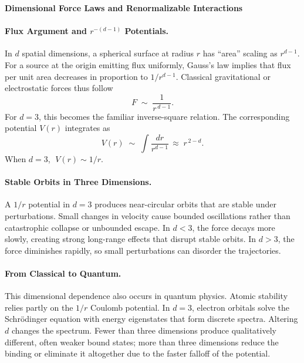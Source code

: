 \begin{technical}
    {\Large \textbf{Dimensional Force Laws and Renormalizable Interactions}}
    
    \paragraph{Flux Argument and $r^{-(d-1)}$ Potentials.}
    In $d$ spatial dimensions, a spherical surface at radius $r$ has ``area'' scaling as $r^{d-1}$. For a source at the origin emitting flux uniformly, Gauss's law implies that flux per unit area decreases in proportion to $1/r^{d-1}$. Classical gravitational or electrostatic forces thus follow 
    $$
    F \;\sim\; \frac{1}{r^{\,d-1}}.
    $$
    For $d=3$, this becomes the familiar inverse-square relation. The corresponding potential $V(r)$ integrates as
    $$
    V(r) \;\sim\; \int \frac{dr}{r^{d-1}} \,\approx\; r^{\,2-d}.
    $$
    When $d=3$, $\;V(r)\sim 1/r$.
    
    \paragraph{Stable Orbits in Three Dimensions.}
    A $1/r$ potential in $d=3$ produces near-circular orbits that are stable under perturbations. Small changes in velocity cause bounded oscillations rather than catastrophic collapse or unbounded escape. In $d<3$, the force decays more slowly, creating strong long-range effects that disrupt stable orbits. In $d>3$, the force diminishes rapidly, so small perturbations can disorder the trajectories.
    
    \paragraph{From Classical to Quantum.}
    This dimensional dependence also occurs in quantum physics. Atomic stability relies partly on the $1/r$ Coulomb potential. In $d=3$, electron orbitals solve the Schrödinger equation with energy eigenstates that form discrete spectra. Altering $d$ changes the spectrum. Fewer than three dimensions produce qualitatively different, often weaker bound states; more than three dimensions reduce the binding or eliminate it altogether due to the faster falloff of the potential.
    

\end{technical}
